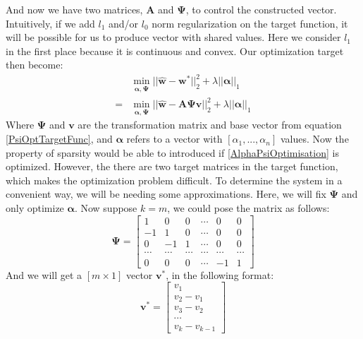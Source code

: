 \documentclass[preprint,10pt]{elsarticle}
\begin{document}
And now we have two matrices, $\boldsymbol{A}$ and $\boldsymbol{\Psi}$, to control the constructed vector. Intuitively, if we add $l_1$ and/or $l_0$ norm regularization on the target function, it will be possible for us to produce vector with shared values. Here we consider $l_1$ in the first place because it is continuous and convex. Our optimization target then become:\\
\begin{equation}\label{AlphaPsiOptimisation}
\begin{aligned}
&\min_{\boldsymbol{\alpha},\boldsymbol{\Psi}} ||\boldsymbol{\hat{w}}-\boldsymbol{w}^{*}||_{2}^{2} + \lambda ||\boldsymbol{\alpha}||_{1}\\
=&\min_{\boldsymbol{\alpha},\boldsymbol{\Psi}} ||\boldsymbol{\hat{w}}-\boldsymbol{A}\boldsymbol{\Psi}\boldsymbol{v}||_{2}^{2} + \lambda ||\boldsymbol{\alpha}||_{1}
\end{aligned}
\end{equation}
Where $\boldsymbol{\Psi}$ and $\boldsymbol{v}$ are the transformation matrix and base vector from equation \ref{PsiOptTargetFunc}, and $\boldsymbol{\alpha}$ refers to a vector with $[\alpha_{1},...,\alpha_{n}]$ values. Now the property of sparsity would be able to introduced if \ref{AlphaPsiOptimisation} is optimized. However, the there are two target matrices in the target function, which makes the optimization problem difficult. To determine the system in a convenient way, we will be needing some approximations. Here, we will fix $\boldsymbol{\Psi}$ and only optimize $\boldsymbol{\alpha}$. Now suppose $k=m$, we could pose the matrix as follows:\\
$$
\boldsymbol{\Psi} = 
\begin{bmatrix}
1 & 0 & 0 & \cdots & 0 & 0\\
-1 & 1 & 0 & \cdots & 0 & 0\\
0  & -1 & 1 & \cdots & 0 & 0\\
\cdots & \cdots & \cdots & \cdots & \cdots & \cdots \\
0 & 0 & 0 & \cdots & -1 & 1
\end{bmatrix}
$$
And we will get a $[m \times 1]$ vector $\boldsymbol{v}^{*}$, in the following format:\\
$$
\boldsymbol{v}^{*} = 
\begin{bmatrix}
v_{1}\\
v_{2}-v_{1}\\
v_{3}-v_{2}\\
\cdots\\
v_{k} - v_{k-1}
\end{bmatrix}
$$
\end{document}
